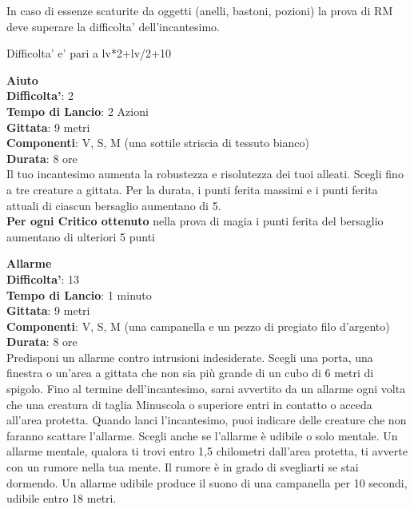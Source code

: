 \begin{multicols}{2}
In caso di essenze scaturite da oggetti (anelli, bastoni, pozioni) la prova di RM deve superare la difficolta' dell'incantesimo.


\bigskip

Difficolta' e' pari a lv*2+lv/2+10

\pagebreak




\textbf{Aiuto}\\
\textbf{Difficolta'}: 2\\
\textbf{Tempo di Lancio}: 2 Azioni\\
\textbf{Gittata}: 9 metri\\
\textbf{Componenti}: V, S, M (una sottile striscia di tessuto bianco)\\
\textbf{Durata}: 8 ore\\
Il tuo incantesimo aumenta la robustezza e risolutezza dei tuoi alleati. Scegli fino a tre creature a gittata. Per la durata, i punti ferita massimi e i punti ferita attuali di ciascun bersaglio aumentano di 5.\\
\textbf{Per ogni Critico ottenuto} nella prova di magia i punti ferita del bersaglio aumentano di ulteriori 5 punti


\textbf{Allarme}\\
\textbf{Difficolta'}: 13\\
\textbf{Tempo di Lancio}: 1 minuto\\
\textbf{Gittata}: 9 metri\\
\textbf{Componenti}: V, S, M (una campanella e un pezzo di pregiato filo d’argento)\\
\textbf{Durata}: 8 ore\\
Predisponi un allarme contro intrusioni indesiderate. Scegli una porta, una finestra o un’area a gittata che non sia più grande di un cubo di 6 metri di spigolo. Fino al termine dell’incantesimo, sarai avvertito da un allarme ogni volta che una creatura di taglia Minuscola o superiore entri in contatto o acceda all’area protetta. Quando lanci l’incantesimo, puoi indicare delle creature che non faranno scattare l’allarme. Scegli anche se l’allarme è udibile o solo mentale. Un allarme mentale, qualora ti trovi entro 1,5 chilometri dall’area protetta, ti avverte con un rumore nella tua mente. Il rumore è in grado di svegliarti se stai dormendo. Un allarme udibile produce il suono di una campanella per 10 secondi, udibile entro 18 metri.


\end{multicols}
